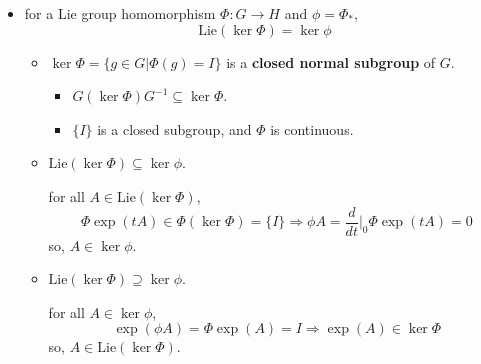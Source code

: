 \begin{itemize}
	\item for a Lie group homomorphism $\Phi : G \rightarrow H$ and $\phi = \Phi_*$,
	\begin{equation} \label{5.1.12}
		\mathrm{Lie}(\ker \Phi) = \ker \phi
	\end{equation}
	
	\begin{tcolorbox}[title=proof:]
		\begin{itemize}
			\item $\ker \Phi = \{g \in G | \Phi(g) = I\}$ is a \textbf{closed normal subgroup} of $G$.
			\begin{itemize}
				\item $G (\ker \Phi) G^{- 1} \subseteq \ker \Phi$.
				
				\item $\{I\}$ is a closed subgroup, and $\Phi$ is continuous.
			\end{itemize}
			
			\item $\mathrm{Lie}(\ker \Phi) \subseteq \ker \phi$.
			
			for all $A \in \mathrm{Lie}(\ker \Phi)$,
			\begin{equation}
				\Phi \exp(t A) \in \Phi(\ker \Phi) = \{I\} \Longrightarrow \phi A = \frac{d}{dt} \Big|_0 \Phi \exp(t A) = 0
			\end{equation}
			so, $A \in \ker \phi$.
			
			\item $\mathrm{Lie}(\ker \Phi) \supseteq \ker \phi$.
			
			for all $A \in \ker \phi$,
			\begin{equation}
				\exp(\phi A) = \Phi \exp(A) = I \Longrightarrow \exp(A) \in \ker \Phi
			\end{equation}
			so, $A \in \mathrm{Lie}(\ker \Phi)$.
		\end{itemize}
	\end{tcolorbox}
\end{itemize}

